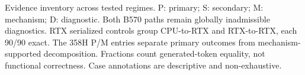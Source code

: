 \begin{table}[t]
\caption{Evidence inventory across tested regimes. P: primary; S: secondary; M: mechanism; D: diagnostic. Both B570 paths remain globally inadmissible diagnostics. RTX serialized controls group CPU-to-RTX and RTX-to-RTX, each 90/90 exact. The 358H P/M entries separate primary outcomes from mechanism-supported decomposition. Fractions count generated-token equality, not functional correctness. Case annotations are descriptive and non-exhaustive.}
\label{tab:regimes}
\centering
\begingroup

\endgroup
\end{table}
